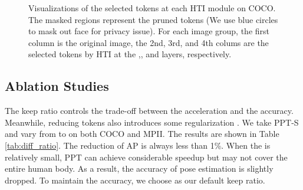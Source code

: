 \documentclass[runningheads]{llncs}
\begin{document}
\begin{figure}[t]
\small 
    \centering
             \caption{
    \small{Visualizations of the selected tokens at each HTI module on COCO. The masked regions represent the pruned tokens (We use blue circles to mask out face for privacy issue). For each image group, the first column is the original image, the 2nd, 3rd, and 4th colums are the selected tokens by HTI at the ,, and  layers, respectively.  }
    }
    \label{fig:human_mask}
\end{figure}


\vspace{-0.5em}
\subsection{Ablation Studies}
\vspace{-0.5em}

The keep ratio  controls the trade-off between the acceleration and the accuracy. Meanwhile, reducing tokens also introduces some regularization \cite{zhu2020deformable}. 
We take PPT-S and vary  from  to  on both COCO and MPII. The results are shown in Table \ref{tab:diff_ratio}. The reduction of AP is always less than 1\%. 
When the  is relatively small, PPT can achieve considerable speedup but may not cover the entire human body. As a result, the accuracy of pose estimation is slightly dropped.  
To maintain the accuracy, we choose  as our default keep ratio. 
\end{document}
